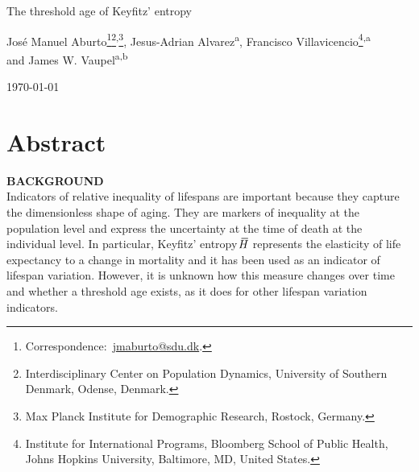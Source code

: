 \documentclass[a4paper,twoside, openright, 12pt, leqno]{article}
\newcommand*\xbar[1]{%
   \hbox{%
     \vbox{%
       \hrule height 0.5pt %
       \kern0.3ex%
       \hbox{%
         \kern-0.25em%
         \ensuremath{#1}%
         \kern-0.05em%
       }%
     }%
   }%
}
\newcommand\fnsep{\textsuperscript{,}}
\begin{document}
\renewcommand{\thefootnote}{\alph{footnote}}

\thispagestyle{empty}

\begin{center}
    
    \vspace*{1cm}
    \LARGE{The threshold age of Keyfitz' entropy}	
    \vspace{.4cm}    
        
           
    \vspace{1cm}
    \large Jos\'e Manuel Aburto\footnote[*]{Correspondence:~\href{mailto:jmaburto@sdu.dk}{jmaburto@sdu.dk}.}\footnote{Interdisciplinary Center on Population Dynamics, University of Southern Denmark, Odense, Denmark.}\fnsep\footnote{Max Planck Institute for Demographic Research, Rostock, Germany.}, Jesus-Adrian Alvarez\textsuperscript{a}, Francisco Villavicencio\footnote{Institute for International Programs, Bloomberg School of Public Health, Johns Hopkins University, Baltimore, MD, United States.}\fnsep\textsuperscript{a}\\ and James W. Vaupel\textsuperscript{a}\fnsep\textsuperscript{b}
    
    \vspace{1cm}
    \large\today
    \vspace{1cm}
       
\end{center}

\renewcommand{\thefootnote}{\arabic{footnote}}
\setcounter{footnote}{0}

\section*{Abstract}
\bigskip

\textbf{BACKGROUND} \\
Indicators of relative inequality of lifespans are important because they capture the dimensionless shape of aging. They are markers of inequality at the population level and express the uncertainty at the time of death at the individual level. In particular, Keyfitz' entropy $\xbar{H}$ represents the elasticity of life expectancy to a change in mortality and it has been used as an indicator of lifespan variation. However, it is unknown how this measure changes over time and whether a threshold age exists, as it does for other lifespan variation indicators.
\bigskip
\end{document}
